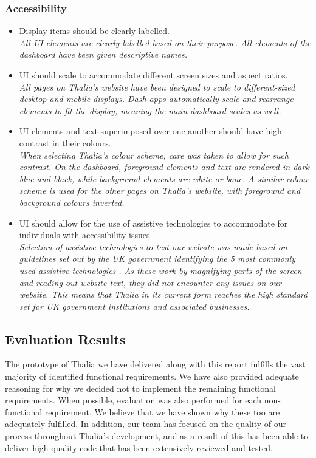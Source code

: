 \documentclass[main.tex]{subfiles}
\begin{document}
\subsubsection{Accessibility}
\begin{itemize}
    \item Display items should be clearly labelled.\\
    \textit{All UI elements are clearly labelled based on their purpose. All elements of the dashboard have been given descriptive names.}
    \item UI should scale to accommodate diﬀerent screen sizes and aspect ratios.\\
    \textit{All pages on Thalia's website have been designed to scale to different-sized desktop and mobile displays. Dash apps automatically scale and rearrange elements to fit the display, meaning the main dashboard scales as well.}
    \item UI elements and text superimposed over one another should have high contrast in their colours.\\
    \textit{When selecting Thalia’s colour scheme, care was taken to allow for such contrast. On the dashboard, foreground elements and text are rendered in dark blue and black, while background elements are white or bone. A similar colour scheme is used for the other pages on Thalia’s website, with foreground and background colours inverted.}
    
    \item UI should allow for the use of assistive technologies to accommodate for individuals with accessibility issues.\\
    \textit{Selection of assistive technologies to test our website was made based on guidelines set out by the UK government identifying the 5 most commonly used assistive technologies \cite{govUKAccessability}. As these work by magnifying parts of the screen and reading out website text, they did not encounter any issues on our website. This means that Thalia in its current form reaches the high standard set for UK government institutions and associated businesses.}

\end{itemize}

\subsection{Evaluation Results}
    The prototype of Thalia we have delivered along with this report fulfills the vast majority of identified functional requirements. We have also provided adequate reasoning for why we decided not to implement the remaining functional requirements. When possible, evaluation was also performed for each non-functional requirement. We believe that we have shown why these too are adequately fulfilled. In addition, our team has focused on the quality of our process throughout Thalia’s development, and as a result of this has been able to deliver high-quality code that has been extensively reviewed and tested. 
\end{document}
